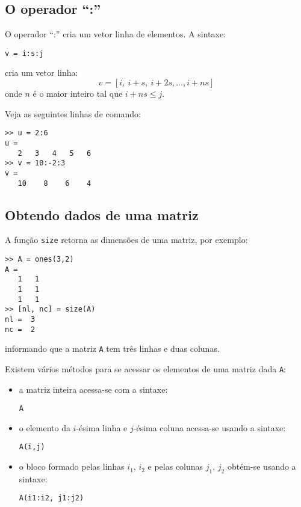 \subsection{O operador ``:''}

O operador ``:'' cria um vetor linha de elementos. A sintaxe:
\begin{verbatim}
v = i:s:j
\end{verbatim}
cria um vetor linha:
\begin{equation*}
  v = [i,~i+s,~i+2s,\dotsc, i+ns]
\end{equation*}
onde $n$ é o maior inteiro tal que $i + ns \leq j$.

\begin{ex}
Veja as seguintes linhas de comando:
\begin{verbatim}
>> u = 2:6
u =
   2   3   4   5   6
>> v = 10:-2:3
v =
   10    8    6    4
\end{verbatim}
\end{ex}

\subsection{Obtendo dados de uma matriz}

A função \verb+size+ retorna as dimensões de uma matriz, por exemplo:
\begin{verbatim}
>> A = ones(3,2)
A =
   1   1
   1   1
   1   1 
>> [nl, nc] = size(A)
nl =  3
nc =  2
\end{verbatim}
informando que a matriz \verb+A+ tem três linhas e duas colunas.

Existem vários métodos para se acessar os elementos de uma matriz dada \verb+A+:
\begin{itemize}
\item a matriz inteira acessa-se com a sintaxe:
\begin{verbatim}
A
\end{verbatim}
\item o elemento da $i$-ésima linha e $j$-ésima coluna acessa-se usando a sintaxe:
\begin{verbatim}
A(i,j)
\end{verbatim}
\item o bloco formado pelas linhas $i_1$, $i_2$ e pelas colunas $j_1$, $j_2$ obtém-se usando a sintaxe:
\begin{verbatim}
A(i1:i2, j1:j2)
\end{verbatim}
\end{itemize}

